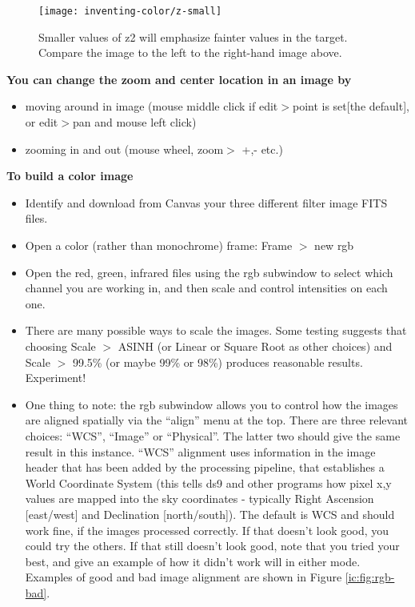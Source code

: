 \begin{figure}
		\texttt{[image: inventing-color/z-small]}
		\caption{Smaller values of z2 will emphasize fainter values in the target. Compare the image to the left to the right-hand image above.}\label{ic:fig:z-small}
\end{figure}

\textbf{You can change the zoom and center location in an image by} 
\begin{itemize}
\item moving around in image (mouse middle click if edit$>$point is set[the default], or edit$>$pan and mouse left click)
\item zooming in and out (mouse wheel, zoom$>$ +,- etc.)
\end{itemize}

\textbf{To build a color image}
\begin{itemize}
	\item Identify and download from Canvas your three different filter image FITS files.
\item Open a color (rather than monochrome) frame:  Frame $>$ new rgb
\item Open the red, green, infrared files using the rgb subwindow to select which channel you are working in, and then scale and control intensities on each one. 
\item There are many possible ways to scale the images. Some testing suggests that choosing Scale $>$ ASINH (or Linear or Square Root as other choices) and Scale $>$ 99.5\% (or maybe 99\% or 98\%)  produces reasonable results. Experiment!
\item One thing to note: the rgb subwindow allows you to control how the images are aligned spatially via the “align” menu at the top. There are three relevant choices: “WCS”, “Image” or “Physical”.  The latter two should give the same result in this instance. “WCS” alignment uses information in the image header that has been added by the processing pipeline, that establishes a World Coordinate System (this tells ds9 and other programs how pixel x,y values are mapped into the sky coordinates - typically Right Ascension [east/west] and Declination [north/south]). The default is WCS and should work fine, if the images processed correctly. If that doesn’t look good, you could try the others. If that still doesn’t look good, note that you tried your best, and give an example of how it didn’t work will in either mode. Examples of good and bad image alignment are shown in Figure \ref{ic:fig:rgb-bad}.
\end{itemize}

